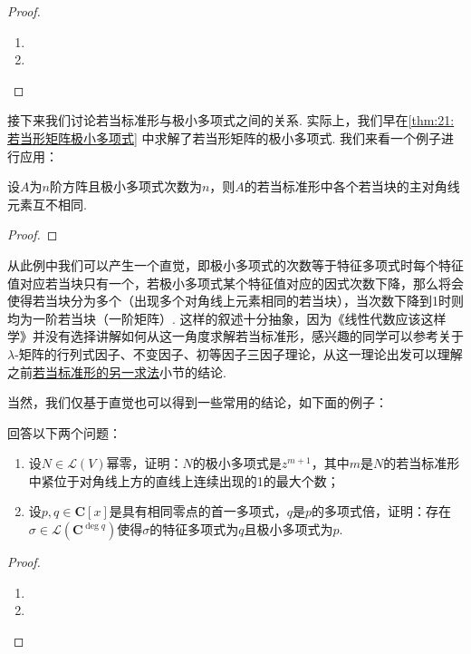 \begin{proof}
    \begin{enumerate}
        \item

        \item
    \end{enumerate}
\end{proof}

接下来我们讨论若当标准形与极小多项式之间的关系. 实际上，我们早在\autoref{thm:21:若当形矩阵极小多项式} 中求解了若当形矩阵的极小多项式. 我们来看一个例子进行应用：
\begin{example}
    设$A$为$n$阶方阵且极小多项式次数为$n$，则$A$的若当标准形中各个若当块的主对角线元素互不相同.
\end{example}

\begin{proof}

\end{proof}

从此例中我们可以产生一个直觉，即极小多项式的次数等于特征多项式时每个特征值对应若当块只有一个，若极小多项式某个特征值对应的因式次数下降，那么将会使得若当块分为多个（出现多个对角线上元素相同的若当块），当次数下降到1时则均为一阶若当块（一阶矩阵）. 这样的叙述十分抽象，因为《线性代数应该这样学》并没有选择讲解如何从这一角度求解若当标准形，感兴趣的同学可以参考关于$\lambda$-矩阵的行列式因子、不变因子、初等因子三因子理论，从这一理论出发可以理解之前\hyperref[sect:22:若当标准形的另一求法]{若当标准形的另一求法}小节的结论.

当然，我们仅基于直觉也可以得到一些常用的结论，如下面的例子：
\begin{example}
    回答以下两个问题：
    \begin{enumerate}
        \item 设$N\in \mathcal{L}(V)$幂零，证明：$N$的极小多项式是$z^{m+1}$，其中$m$是$N$的若当标准形中紧位于对角线上方的直线上连续出现的1的最大个数；

        \item 设$p,q\in\mathbf{C}[x]$是具有相同零点的首一多项式，$q$是$p$的多项式倍，证明：存在$\sigma\in \mathcal{L}(\mathbf{C}^{\deg q})$使得$\sigma$的特征多项式为$q$且极小多项式为$p$.
    \end{enumerate}
\end{example}

\begin{proof}
    \begin{enumerate}
        \item

        \item
    \end{enumerate}
\end{proof}

